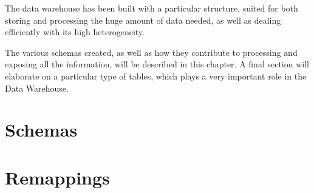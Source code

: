 The data warehouse has been built with a particular structure, suited for both storing and processing the huge amount of data needed, as well as dealing efficiently with its high heterogeneity.

The various schemas created, as well as how they contribute to processing and exposing all the information, will be described in this chapter.
A final section will elaborate on a particular type of tables, which plays a very important role in the Data Warehouse.

\section{Schemas}
    
    
\section{Remappings} \label{section:dwh:remappings}
    